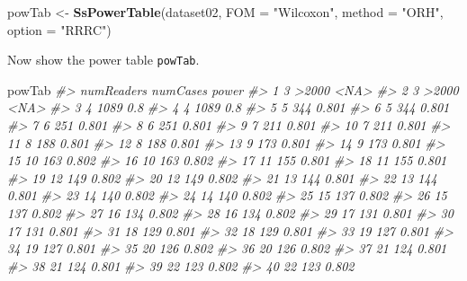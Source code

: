\documentclass[]{book}
\newenvironment{Shaded}{\begin{snugshade}}{\end{snugshade}}
\newcommand{\CommentTok}[1]{\textcolor[rgb]{0.56,0.35,0.01}{\textit{#1}}}
\newcommand{\DataTypeTok}[1]{\textcolor[rgb]{0.13,0.29,0.53}{#1}}
\newcommand{\KeywordTok}[1]{\textcolor[rgb]{0.13,0.29,0.53}{\textbf{#1}}}
\newcommand{\NormalTok}[1]{#1}
\newcommand{\StringTok}[1]{\textcolor[rgb]{0.31,0.60,0.02}{#1}}
\begin{document}
\begin{Shaded}
\begin{Highlighting}[]
\NormalTok{powTab <-}\StringTok{ }\KeywordTok{SsPowerTable}\NormalTok{(dataset02, }\DataTypeTok{FOM =} \StringTok{"Wilcoxon"}\NormalTok{, }\DataTypeTok{method =} \StringTok{"ORH"}\NormalTok{, }\DataTypeTok{option =} \StringTok{"RRRC"}\NormalTok{)}
\end{Highlighting}
\end{Shaded}

Now show the power table \texttt{powTab}.

\begin{Shaded}
\begin{Highlighting}[]
\NormalTok{powTab}
\CommentTok{#>     numReaders numCases power}
\CommentTok{#> 1            3    >2000  <NA>}
\CommentTok{#> 2            3    >2000  <NA>}
\CommentTok{#> 3            4     1089   0.8}
\CommentTok{#> 4            4     1089   0.8}
\CommentTok{#> 5            5      344 0.801}
\CommentTok{#> 6            5      344 0.801}
\CommentTok{#> 7            6      251 0.801}
\CommentTok{#> 8            6      251 0.801}
\CommentTok{#> 9            7      211 0.801}
\CommentTok{#> 10           7      211 0.801}
\CommentTok{#> 11           8      188 0.801}
\CommentTok{#> 12           8      188 0.801}
\CommentTok{#> 13           9      173 0.801}
\CommentTok{#> 14           9      173 0.801}
\CommentTok{#> 15          10      163 0.802}
\CommentTok{#> 16          10      163 0.802}
\CommentTok{#> 17          11      155 0.801}
\CommentTok{#> 18          11      155 0.801}
\CommentTok{#> 19          12      149 0.802}
\CommentTok{#> 20          12      149 0.802}
\CommentTok{#> 21          13      144 0.801}
\CommentTok{#> 22          13      144 0.801}
\CommentTok{#> 23          14      140 0.802}
\CommentTok{#> 24          14      140 0.802}
\CommentTok{#> 25          15      137 0.802}
\CommentTok{#> 26          15      137 0.802}
\CommentTok{#> 27          16      134 0.802}
\CommentTok{#> 28          16      134 0.802}
\CommentTok{#> 29          17      131 0.801}
\CommentTok{#> 30          17      131 0.801}
\CommentTok{#> 31          18      129 0.801}
\CommentTok{#> 32          18      129 0.801}
\CommentTok{#> 33          19      127 0.801}
\CommentTok{#> 34          19      127 0.801}
\CommentTok{#> 35          20      126 0.802}
\CommentTok{#> 36          20      126 0.802}
\CommentTok{#> 37          21      124 0.801}
\CommentTok{#> 38          21      124 0.801}
\CommentTok{#> 39          22      123 0.802}
\CommentTok{#> 40          22      123 0.802}

\end{Highlighting}
\end{Shaded}
\end{document}

